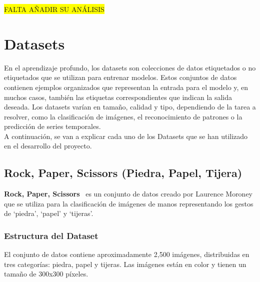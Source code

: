 \colorbox{yellow}{FALTA AÑADIR SU ANÁLISIS}


\section{Datasets}\label{sec:datasets}
En el aprendizaje profundo, los datasets son colecciones de datos etiquetados o no etiquetados que se utilizan para
entrenar modelos.
Estos conjuntos de datos contienen ejemplos organizados que representan la entrada para el modelo y, en muchos casos,
también las etiquetas correspondientes que indican la salida deseada.
Los datasets varían en tamaño, calidad y tipo, dependiendo de la tarea a resolver, como la clasificación de imágenes,
el reconocimiento de patrones o la predicción de series temporales. \\[6pt]

A continuación, se van a explicar cada uno de los Datasets que se han utilizado en el desarrollo del proyecto.

\subsection{Rock, Paper, Scissors (Piedra, Papel, Tijera)}\label{subsec:rock-paper-scissors}
\textbf{Rock, Paper, Scissors}~\cite{noauthor_rock_nodate} es un conjunto de datos creado por Laurence Moroney
que se utiliza para la clasificación de imágenes de manos representando los gestos de `piedra', `papel' y `tijeras'.

\subsubsection{Estructura del Dataset}
El conjunto de datos contiene aproximadamente 2,500 imágenes, distribuidas en tres categorías: piedra, papel y tijeras.
Las imágenes están en color y tienen un tamaño de 300x300 píxeles.

